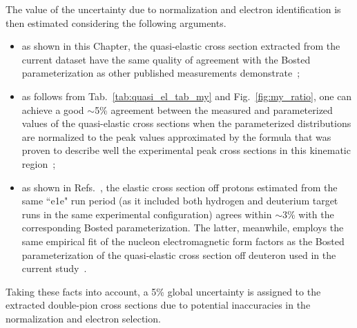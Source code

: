 The value of the uncertainty due to normalization and electron identification is then estimated considering the following arguments.

\begin{itemize}

\item as shown in this Chapter, the quasi-elastic cross section extracted from the current dataset have the same quality of agreement with the Bosted parameterization as other published measurements demonstrate~\cite{note_QE_peak};

\item as follows from Tab.~\ref{tab:quasi_el_tab_my} and Fig.~\ref{fig:my_ratio}, one can achieve a good $\sim$5\% agreement between the measured and parameterized values of the quasi-elastic cross sections when the parameterized distributions are normalized to the peak values approximated by the formula that was proven to describe well the experimental peak cross sections in this kinematic region~\cite{note_QE_peak};

\item as shown in Refs.~\cite{Fed_an_note:2017,Fed_paper_2018}, the elastic cross section off protons estimated from the same ``e1e" run period (as it included both hydrogen and deuterium target runs in the same experimental configuration) agrees within $\sim$3\% with the corresponding Bosted parameterization. The latter, meanwhile, employs the same empirical fit of the nucleon electromagnetic form factors as the Bosted parameterization of the quasi-elastic cross section off deuteron used in the current study~\cite{Bosted:1994tm}.  



\end{itemize}

Taking these facts into account, a 5\% global uncertainty is assigned to the extracted double-pion cross sections due to potential inaccuracies in the normalization and electron selection.


